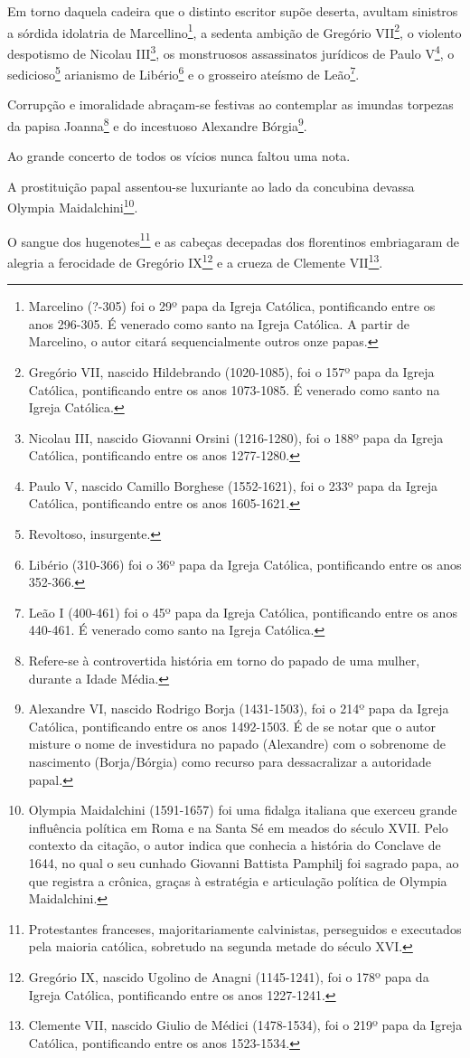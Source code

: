 Em torno daquela cadeira que o distinto escritor supõe deserta, avultam
sinistros a sórdida idolatria de Marcellino\footnote{Marcelino (?-305)
  foi o 29º papa da Igreja Católica, pontificando entre os anos 296-305.
  É venerado como santo na Igreja Católica. A partir de Marcelino, o
  autor citará sequencialmente outros onze papas.}, a sedenta ambição de
Gregório VII\footnote{Gregório VII, nascido Hildebrando (1020-1085),
  foi o 157º papa da Igreja Católica, pontificando entre os anos
  1073-1085. É venerado como santo na Igreja Católica.}, o violento
despotismo de Nicolau III\footnote{Nicolau III, nascido Giovanni
  Orsini (1216-1280), foi o 188º papa da Igreja Católica, pontificando
  entre os anos 1277-1280.}, os monstruosos assassinatos jurídicos de
Paulo V\footnote{Paulo V, nascido Camillo Borghese (1552-1621), foi o
  233º papa da Igreja Católica, pontificando entre os anos 1605-1621.},
o sedicioso\footnote{Revoltoso, insurgente.} arianismo de
Libério\footnote{Libério (310-366) foi o 36º papa da Igreja Católica,
  pontificando entre os anos 352-366.} e o grosseiro ateísmo de
Leão\footnote{Leão I (400-461) foi o 45º papa da Igreja Católica,
  pontificando entre os anos 440-461. É venerado como santo na Igreja
  Católica.}.

Corrupção e imoralidade abraçam-se festivas ao contemplar as imundas
torpezas da papisa Joanna\footnote{Refere-se à controvertida história
  em torno do papado de uma mulher, durante a Idade Média.} e do
incestuoso Alexandre Bórgia\footnote{Alexandre VI, nascido Rodrigo
  Borja (1431-1503), foi o 214º papa da Igreja Católica, pontificando
  entre os anos 1492-1503. É de se notar que o autor misture o nome de
  investidura no papado (Alexandre) com o sobrenome de nascimento
  (Borja/Bórgia) como recurso para dessacralizar a autoridade papal.}.

Ao grande concerto de todos os vícios nunca faltou uma nota.

A prostituição papal assentou-se luxuriante ao lado da concubina devassa
Olympia Maidalchini\footnote{Olympia Maidalchini (1591-1657) foi uma
  fidalga italiana que exerceu grande influência política em Roma e na
  Santa Sé em meados do século XVII. Pelo contexto da citação, o autor
  indica que conhecia a história do Conclave de 1644, no qual o seu
  cunhado Giovanni Battista Pamphilj foi sagrado papa, ao que registra a
  crônica, graças à estratégia e articulação política de Olympia
  Maidalchini.}.

O sangue dos hugenotes\footnote{Protestantes franceses,
  majoritariamente calvinistas, perseguidos e executados pela maioria
  católica, sobretudo na segunda metade do século XVI.} e as cabeças
decepadas dos florentinos embriagaram de alegria a ferocidade de
Gregório IX\footnote{Gregório IX, nascido Ugolino de Anagni
  (1145-1241), foi o 178º papa da Igreja Católica, pontificando entre os
  anos 1227-1241.} e a crueza de Clemente VII\footnote{Clemente VII,
  nascido Giulio de Médici (1478-1534), foi o 219º papa da Igreja
  Católica, pontificando entre os anos 1523-1534.}.

